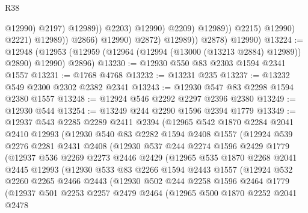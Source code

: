\begin{lexlean}{R38}
\begin{coremodule}
                                              @12990)
                                            @2197)
                                          @12989))
                                      @2203)
                                    @12990)
                                  @2209)
                                @12989))
                            @2215)
                          @12990)
                        @2221)
                      @12989))
                  @2866)
                @12990)
              @2872)
            @12989))
        @2878)
      @12990)
@13224 := @12948
    (@12953 (@12959 (@12964 (@12994 (@13000 (@13213 @2884) @12989)) @2890) @12990) @2896)
@13230 := @12930 @550 @83 @2303 @1594 @2341 @1557
@13231 := @1768 @4768
@13232 := @13231 @235
@13237 := @13232 @549 @2300 @2302 @2382 @2341
@13243 := @12930 @547 @83 @2298 @1594 @2380 @1557
@13248 := @12924 @546 @2292 @2297 @2396 @2380
@13249 := @12930 @544
@13254 := @13249 @244 @2290 @1596 @2394 @1779
@13349 := @12937
    @543
    @2285
    @2289
    @2411
    @2394
    (@12965
      @542
      @1870
      @2284
      @2041
      @2410
      @12993
      (@12930
        @540
        @83
        @2282
        @1594
        @2408
        @1557
        (@12924
          @539
          @2276
          @2281
          @2431
          @2408
          (@12930
            @537
            @244
            @2274
            @1596
            @2429
            @1779
            (@12937
              @536
              @2269
              @2273
              @2446
              @2429
              (@12965
                @535
                @1870
                @2268
                @2041
                @2445
                @12993
                (@12930
                  @533
                  @83
                  @2266
                  @1594
                  @2443
                  @1557
                  (@12924
                    @532
                    @2260
                    @2265
                    @2466
                    @2443
                    (@12930
                      @502
                      @244
                      @2258
                      @1596
                      @2464
                      @1779
                      (@12937
                        @501
                        @2253
                        @2257
                        @2479
                        @2464
                        (@12965
                          @500
                          @1870
                          @2252
                          @2041
                          @2478

\end{coremodule}
\end{lexlean}
